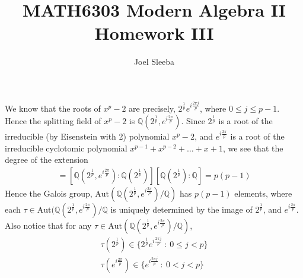 \documentclass[12pt]{exam}
\theoremstyle{plain} %
\theoremstyle{definition} %
\theoremstyle{remark} %
\begin{document}
\title{MATH6303 Modern Algebra II \\ Homework  III}

\author{
  Joel Sleeba \\
}

\maketitle
\printanswers
\unframedsolutions

\begin{questions}

  \question
  \begin{solution}
    We know that the roots of $x^p - 2$ are precisely,
    $2^{\frac{1}{p}}e^{i\frac{ 2\pi j}{p}}$, where $0 \le j \le p-1$.
    Hence the splitting field of $x^p - 2$ is
    $\mathbb{Q}(2^{\frac{1}{p}}, e^{i\frac{2\pi}{p}})$. Since
    $2^{\frac{1}{p}}$ is a root of the irreducible (by Eisenstein
    with 2) polynomial $x^p - 2$, and $e^{i \frac{2 \pi}{p}}$ is a
    root of the irreducible cyclotomic polynomial $x^{p-1} + x^{p-2}
    + \ldots + x + 1$, we see that the degree of the extension
    \begin{align*}
      [\mathbb{Q}(2^{\frac{1}{p}}, e^{i \frac{2 \pi}{ p}}) :
      \mathbb{Q}] = [\mathbb{Q}(2^{\frac{1}{p}}, e^{i \frac{2 \pi}{
      p}}) : \mathbb{Q}(2^{\frac{1}{p}})]
      [\mathbb{Q}(2^{\frac{1}{p}}) : \mathbb{Q}] = p(p-1)
    \end{align*}
    Hence the Galois group, $\textrm{Aut}(\mathbb{Q}(2^{\frac{1}{p}},
    e^{i \frac{2 \pi}{ p}})/ \mathbb{Q})$ has $p(p-1)$ elements,
    where each $\tau \in \textrm{Aut}(\mathbb{Q}(2^{\frac{1}{p}},
      e^{i \frac{2 \pi}{ p}})/ \mathbb{Q}$ is uniquely determined by the image
      of $2^{\frac{1}{p}}$, and $e^{i \frac{2 \pi}{p}}$.
      Also notice that for any $\tau \in
      \textrm{Aut}(\mathbb{Q}(2^{\frac{1}{p}},
      e^{i \frac{2 \pi}{ p}})/ \mathbb{Q})$,
      \begin{align*}
        \tau(2^{\frac{1}{p}})
        \in \{ 2^{\frac{1}{p}} e^{i \frac{2\pi j}{p}}  \ : \  0 \le j
        < p   \} \\
        \tau(e^{i \frac{2\pi}{p}})
        \in \{ e^{i \frac{2\pi j}{p}}  \ : \  0 < j < p   \}
      \end{align*}


\end{solution}
\end{questions}
\end{document}
